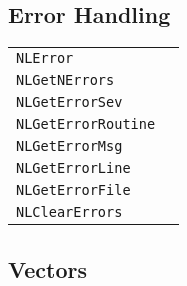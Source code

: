 \documentclass[12pt]{article}
\begin{document}
\subsection{Error Handling}

\begin{center}
\begin{tabular}{ll}
\tt NLError&\pageref{Subroutine:NLError}\\
\tt NLGetNErrors&\pageref{Subroutine:NLGetNErrors}\\
\tt NLGetErrorSev&\pageref{Subroutine:NLGetErrorSev}\\
\tt NLGetErrorRoutine&\pageref{Subroutine:NLGetErrorRoutine}\\
\tt NLGetErrorMsg&\pageref{Subroutine:NLGetErrorMsg}\\
\tt NLGetErrorLine&\pageref{Subroutine:NLGetErrorLine}\\
\tt NLGetErrorFile&\pageref{Subroutine:NLGetErrorFile}\\
\tt NLClearErrors&\pageref{Subroutine:NLClearErrors}\\
\end{tabular}
\end{center}

\subsection{Vectors}
\end{document}

